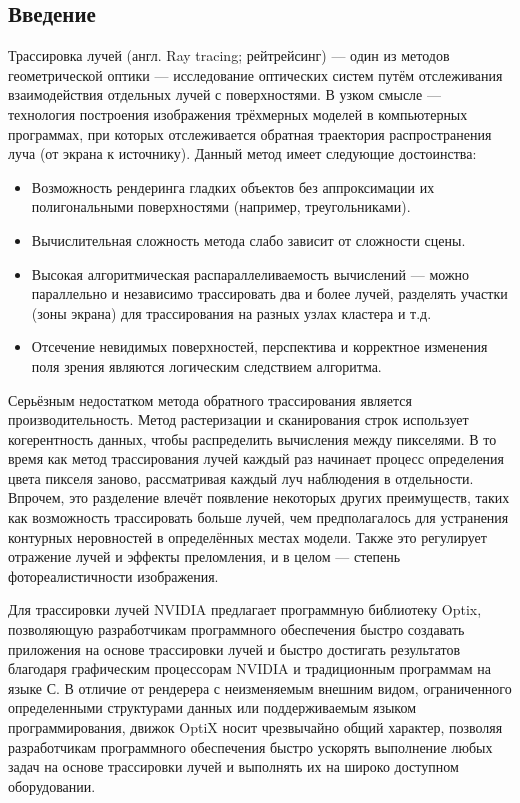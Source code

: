\begin{center}
\section*{Введение}
\end{center}

Трассировка лучей (англ. Ray tracing; рейтрейсинг) --- один из методов геометрической оптики --- исследование оптических систем путём отслеживания взаимодействия отдельных лучей с поверхностями. В узком смысле --- технология построения изображения трёхмерных моделей в компьютерных программах, при которых отслеживается обратная траектория распространения луча (от экрана к источнику).
Данный метод имеет следующие достоинства:
\begin{itemize}
\item Возможность рендеринга гладких объектов без аппроксимации их полигональными поверхностями (например, треугольниками).
\item Вычислительная сложность метода слабо зависит от сложности сцены.
\item Высокая алгоритмическая распараллеливаемость вычислений — можно параллельно и независимо трассировать два и более лучей, разделять участки (зоны экрана) для трассирования на разных узлах кластера и т.д.
\item Отсечение невидимых поверхностей, перспектива и корректное изменения поля зрения являются логическим следствием алгоритма.
\end{itemize}
Серьёзным недостатком метода обратного трассирования является производительность. 
Метод растеризации и сканирования строк использует когерентность данных, чтобы распределить вычисления между пикселями. 
В то время как метод трассирования лучей каждый раз начинает процесс определения цвета пикселя заново, рассматривая каждый луч наблюдения в отдельности. 
Впрочем, это разделение влечёт появление некоторых других преимуществ, таких как возможность трассировать больше лучей, чем предполагалось для устранения контурных неровностей в определённых местах модели. 
Также это регулирует отражение лучей и эффекты преломления, и в целом — степень фотореалистичности изображения.\cite{Wiki}

Для трассировки лучей NVIDIA предлагает программную библиотеку Optix, позволяющую разработчикам программного обеспечения быстро создавать приложения на основе трассировки лучей и быстро достигать результатов благодаря графическим процессорам NVIDIA и традиционным программам на языке С. 
В отличие от рендерера с неизменяемым внешним видом, ограниченного определенными структурами данных или поддерживаемым языком программирования, движок OptiX носит чрезвычайно общий характер, позволяя разработчикам программного обеспечения быстро ускорять выполнение любых задач на основе трассировки лучей и выполнять их на широко доступном оборудовании.

